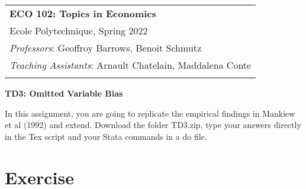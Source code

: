\documentclass[11pt, a4paper]{article} %
\begin{document}
\begin{tabular}{p{14.5cm}}
	{\large \textbf{ECO 102: Topics in Economics}} \\
	Ecole Polytechnique, Spring 2022  \\
	\textit{Professors}: Geoffroy Barrows, Benoit Schmutz \\
	\textit{Teaching Assistants}: Arnault Chatelain, Maddalena Conte \\
	\hline
	\\
\end{tabular}

\begin{center}
	{\Large \textbf{TD3: Omitted Variable Bias}}
	\vspace{2mm}
	
\end{center} 

\vspace{0.4cm}

In this assignment, you are going to replicate the empirical findings in Mankiew et al (1992) and extend.  Download the folder TD3.zip, type your answers directly in the Tex script and your Stata commands in a do file.


\section*{Exercise}
\end{document}
